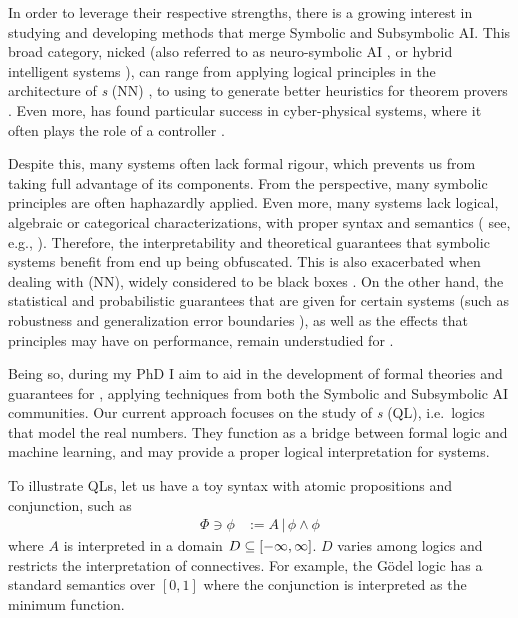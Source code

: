 In order to leverage their respective strengths, there is a growing interest in studying and developing methods that merge Symbolic and Subsymbolic AI. This broad category, nicked \emph{\InAI{}}  \citep{Platzer_2024} (also referred to as neuro-symbolic AI \citep{d2009neural}, or hybrid intelligent systems \citep{medsker2012hybrid}), can range from applying logical principles in the architecture of \emph{ \NN{}s} (NN)  \citep{badreddine2022logic}, to using \SuAI{} to generate better heuristics for theorem provers \citep{laurent2022learning}. Even more, \InAI{} has found particular success in cyber-physical systems, where it often plays the role of a controller \citep{Platzer_2024}. 

Despite this, many \InAI{} systems often lack formal rigour, which prevents us from taking full advantage of its components. From the \SiAI{} perspective,  many symbolic principles are often haphazardly applied. Even more, many \InAI{} systems lack logical, algebraic or categorical characterizations, with proper syntax and semantics ( see, e.g., \cite{kaposi2024second}). Therefore, the interpretability and theoretical guarantees that symbolic systems benefit from end up being obfuscated. This is also exacerbated when dealing with \emph{\NN{}} (NN), widely considered to be black boxes \citep{buhrmester2021analysis}. On the other hand, the statistical and probabilistic guarantees that are given for certain \SuAI{}  systems (such as robustness \citep{casadio2022neural} and generalization error boundaries \citep{jakubovitz2019generalization} ), as well as the effects that \SiAI{} principles may have on performance, remain understudied for \InAI{}.

Being so, during my PhD I aim to aid in the development of formal theories and guarantees for \InAI{}, applying techniques from both the Symbolic and Subsymbolic AI communities. Our current approach focuses on the study of \emph{\QL{}s} (QL), i.e.~logics that model the real numbers. They function as a bridge between formal logic and machine learning, and may provide a proper logical interpretation for \InAI{} systems.

To illustrate QLs, let us have a toy syntax with atomic propositions and conjunction, such as
\begin{equation}
\begin{split}
    \Phi \ni \phi &:= A \,|\, \phi \land \phi
\end{split}
\end{equation}
where $A$ is interpreted in a domain $D \subseteq [-\infty,\infty]$. $D$ varies among logics and restricts the interpretation of connectives. For example, the
G\"{o}del logic \citep{BAAZ200723} has a standard semantics over $[0, 1]$ where the conjunction is interpreted as the minimum function.

